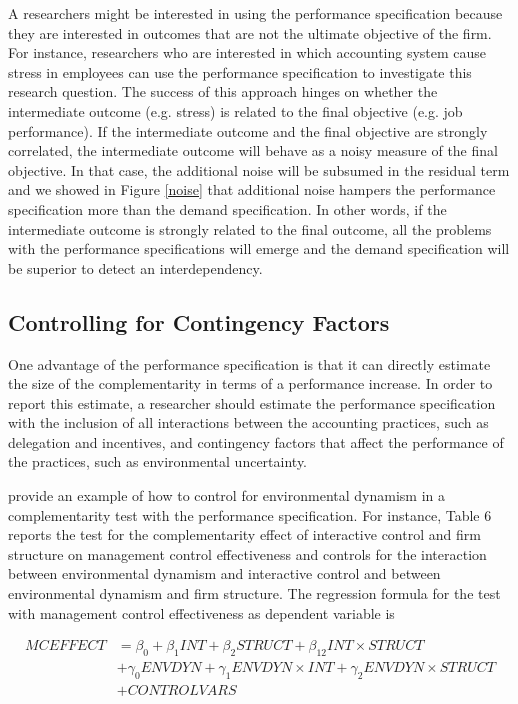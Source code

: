\documentclass[12pt]{article}
\begin{document}
A researchers might be interested in using the performance specification because they are interested in outcomes that are not the ultimate objective of the firm. For instance, researchers who are interested in which accounting system cause stress in employees \citep{shields_design_2000} can use the performance specification to investigate this research question. The success of this approach hinges on whether the intermediate outcome (e.g. stress) is related to the final objective (e.g. job performance). If the intermediate outcome and the final objective are strongly correlated, the intermediate outcome will behave as a noisy measure of the final objective. In that case, the additional noise will be subsumed in the residual term and we showed in Figure \ref{noise} that additional noise hampers the performance specification more than the demand specification. In other words, if the intermediate outcome is strongly related to the final outcome, all the problems with the performance specifications will emerge and the demand specification will be superior to detect an interdependency.

\subsection{Controlling for Contingency Factors}

One advantage of the performance specification is that it can directly estimate the size of the complementarity in terms of a performance increase. In order to report this estimate, a researcher should estimate the performance specification with the inclusion of all interactions between the accounting practices, such as delegation and incentives, and contingency factors that affect the performance of the practices, such as environmental uncertainty. 

\citet{bedford_management_2016} provide an example of how to control for environmental dynamism in a complementarity test with the performance specification. For instance, Table 6 reports the test for the complementarity effect of interactive control and firm structure on management control effectiveness and controls for the interaction between environmental dynamism and interactive control and between environmental dynamism and firm structure. The regression formula for the test with management control effectiveness as dependent variable is 

\begin{align*}
MCEFFECT &= \beta_0 + \beta_1 INT + \beta_2 STRUCT + \beta_{12} INT \times STRUCT \\
&+\gamma_0 ENVDYN + \gamma_1 ENVDYN \times INT + \gamma_2 ENVDYN\times STRUCT \\
&+ CONTROLVARS 
\end{align*}
\end{document}
